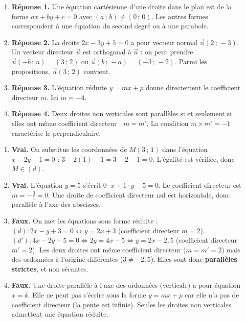 \documentclass[11pt]{article}
\begin{document}
\begin{corrige}
\begin{enumerate}
\item \textbf{Réponse 1.} Une équation cartésienne d'une droite dans le plan est de la forme $ax + by + c = 0$ avec $(a\,;\,b) \neq (0\,;\,0)$. Les autres formes correspondent à une équation du second degré ou à une parabole.
\item \textbf{Réponse 2.} La droite $2x - 3y + 5 = 0$ a pour vecteur normal $\vec{n}(2\,;\,-3)$. Un vecteur directeur $\vec{u}$ est orthogonal à $\vec{n}$ : on peut prendre $\vec{u}(-b\,;\,a) = (3\,;\,2)$ ou $\vec{u}(b\,;\,-a) = (-3\,;\,-2)$. Parmi les propositions, $\vec{u}(3\,;\,2)$ convient.
\item \textbf{Réponse 3.} L'équation réduite $y = mx + p$ donne directement le coefficient directeur $m$. Ici $m = -4$.
\item \textbf{Réponse 4.} Deux droites non verticales sont parallèles si et seulement si elles ont même coefficient directeur : $m = m'$. La condition $m \times m' = -1$ caractérise le perpendiculaire.
\end{enumerate}
\end{corrige}

\begin{corrige}
\begin{enumerate}
\item \textbf{Vrai.} On substitue les coordonnées de $M(3\,;\,1)$ dans l'équation $x - 2y - 1 = 0$ : $3 - 2(1) - 1 = 3 - 2 - 1 = 0$. L'égalité est vérifiée, donc $M \in (d)$.
\item \textbf{Vrai.} L'équation $y = 5$ s'écrit $0\cdot x + 1\cdot y - 5 = 0$. Le coefficient directeur est $m = -\frac{0}{1} = 0$. Une droite de coefficient directeur nul est horizontale, donc parallèle à l'axe des abscisses.
\item \textbf{Faux.} On met les équations sous forme réduite :
$(d) : 2x - y + 3 = 0 \iff y = 2x + 3$ (coefficient directeur $m = 2$).
$(d') : 4x - 2y - 5 = 0 \iff 2y = 4x - 5 \iff y = 2x - 2,5$ (coefficient directeur $m' = 2$).
Les deux droites ont même coefficient directeur ($m=m'=2$) mais des ordonnées à l'origine différentes ($3 \neq -2,5$). Elles sont donc \textbf{parallèles strictes}, et non sécantes.
\item \textbf{Faux.} Une droite parallèle à l'axe des ordonnées (verticale) a pour équation $x = k$. Elle ne peut pas s'écrire sous la forme $y = mx + p$ car elle n'a pas de coefficient directeur (la pente est infinie). Seules les droites non verticales admettent une équation réduite.
\end{enumerate}
\end{corrige}
\end{document}
